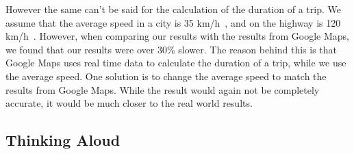 However the same can't be said for the calculation of the duration of a trip.
We assume that the average speed in a city is 35 km/h~\cite{time_city}, and on the highway is 120
km/h~\cite{time_highway}.
However, when comparing our results with the results from Google Maps, we found that our results were over 30\% slower.
The reason behind this is that Google Maps uses real time data to calculate the duration of a trip, while we use the
average speed.
One solution is to change the average speed to match the results from Google Maps.
While the result would again not be completely accurate, it would be much closer to the real world results.

\subsection{Thinking Aloud}\label{subsec:thinking-aloud}

